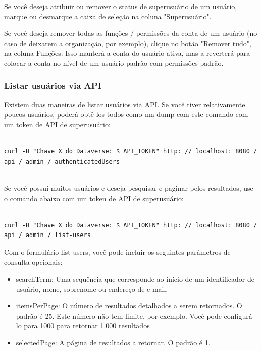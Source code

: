 \documentclass[12pt,hidelinks]{article}
\begin{document}
Se você deseja atribuir ou remover o status de superusuário de um usuário, marque ou desmarque a caixa de seleção na coluna "Superusuário".

Se você deseja remover todas as funções / permissões da conta de um usuário (no caso de deixarem a organização, por exemplo), clique no botão "Remover tudo", na coluna Funções. Isso manterá a conta do usuário ativa, mas a reverterá para colocar a conta no nível de um usuário padrão com permissões padrão.

\subsubsection{Listar usuários via API}

\qquad Existem duas maneiras de listar usuários via API. Se você tiver relativamente poucos usuários, poderá obtê-los todos como um dump com este comando com um token de API de superusuário:

\begin{verbatim}

curl -H "Chave X do Dataverse: $ API_TOKEN" http: // localhost: 8080 / 
api / admin / authenticatedUsers
 

\end{verbatim}
 
Se você possui muitos usuários e deseja pesquisar e paginar pelos resultados, use o comando abaixo com um token de API de superusuário:

\begin{verbatim}

curl -H "Chave X do Dataverse: $ API_TOKEN" http: // localhost: 8080 / 
api / admin / list-users

\end{verbatim}

Com o formulário list-users, você pode incluir os seguintes parâmetros de consulta opcionais:

\begin{itemize}
   
 \item searchTerm: Uma sequência que corresponde ao início de um identificador de usuário, nome, sobrenome ou endereço de e-mail.
 
 \item itemsPerPage: O número de resultados detalhados a serem retornados. O padrão é 25. Este número não tem limite. por exemplo. Você pode configurá-lo para 1000 para retornar 1.000 resultados
 
 \item selectedPage: A página de resultados a retornar. O padrão é 1.

\end{itemize}
\end{document}
